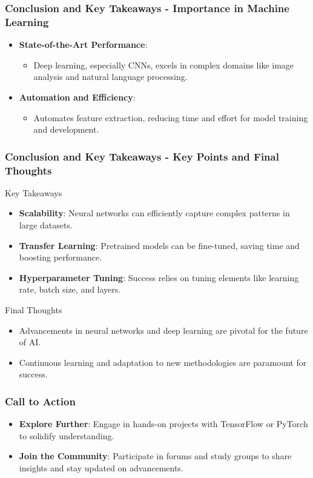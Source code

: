 \documentclass[aspectratio=169]{beamer}
\begin{document}
\begin{frame}[fragile]
  \frametitle{Conclusion and Key Takeaways - Importance in Machine Learning}
  \begin{itemize}
    \item \textbf{State-of-the-Art Performance}:
      \begin{itemize}
        \item Deep learning, especially CNNs, excels in complex domains like image analysis and natural language processing.
      \end{itemize}
    
    \item \textbf{Automation and Efficiency}:
      \begin{itemize}
        \item Automates feature extraction, reducing time and effort for model training and development.
      \end{itemize}
  \end{itemize}
\end{frame}

\begin{frame}[fragile]
  \frametitle{Conclusion and Key Takeaways - Key Points and Final Thoughts}
  \begin{block}{Key Takeaways}
    \begin{itemize}
      \item \textbf{Scalability}: Neural networks can efficiently capture complex patterns in large datasets.
      \item \textbf{Transfer Learning}: Pretrained models can be fine-tuned, saving time and boosting performance.
      \item \textbf{Hyperparameter Tuning}: Success relies on tuning elements like learning rate, batch size, and layers.
    \end{itemize}
  \end{block}
  
  \begin{block}{Final Thoughts}
    \begin{itemize}
      \item Advancements in neural networks and deep learning are pivotal for the future of AI.
      \item Continuous learning and adaptation to new methodologies are paramount for success.
    \end{itemize}
  \end{block}
\end{frame}

\begin{frame}[fragile]
  \frametitle{Call to Action}
  \begin{itemize}
    \item \textbf{Explore Further}: Engage in hands-on projects with TensorFlow or PyTorch to solidify understanding.
    \item \textbf{Join the Community}: Participate in forums and study groups to share insights and stay updated on advancements.
  \end{itemize}
\end{frame}
\end{document}
